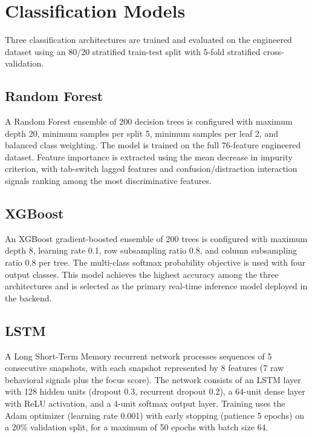 \documentclass[conference]{IEEEtran}
\begin{document}
\section{Classification Models}

Three classification architectures are trained and evaluated on the engineered dataset using an 80/20 stratified train-test split with 5-fold stratified cross-validation.

\subsection{Random Forest}

A Random Forest ensemble of 200 decision trees is configured with maximum depth 20, minimum samples per split 5, minimum samples per leaf 2, and balanced class weighting. The model is trained on the full 76-feature engineered dataset. Feature importance is extracted using the mean decrease in impurity criterion, with tab-switch lagged features and confusion/distraction interaction signals ranking among the most discriminative features.

\subsection{XGBoost}

An XGBoost gradient-boosted ensemble of 200 trees is configured with maximum depth 8, learning rate 0.1, row subsampling ratio 0.8, and column subsampling ratio 0.8 per tree. The multi-class softmax probability objective is used with four output classes. This model achieves the highest accuracy among the three architectures and is selected as the primary real-time inference model deployed in the backend.

\subsection{LSTM}

A Long Short-Term Memory recurrent network processes sequences of 5 consecutive snapshots, with each snapshot represented by 8 features (7 raw behavioral signals plus the focus score). The network consists of an LSTM layer with 128 hidden units (dropout 0.3, recurrent dropout 0.2), a 64-unit dense layer with ReLU activation, and a 4-unit softmax output layer. Training uses the Adam optimizer (learning rate 0.001) with early stopping (patience 5 epochs) on a 20\% validation split, for a maximum of 50 epochs with batch size 64.
\end{document}
